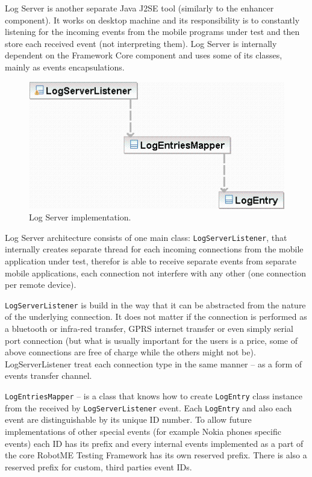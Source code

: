 Log Server is another separate Java J2SE tool (similarly to the enhancer component). It works on desktop
machine and its responsibility is to constantly listening for the incoming events from the
mobile programs under test and then store each received event (not interpreting them). Log Server is 
internally dependent on the Framework Core component and uses some of its classes, mainly
as events encapsulations.

\begin{figure}[t]%
\begin{center}
\includegraphics[width=.7\linewidth]{figures/uml-diagram-logserver}
\end{center}
\caption{Log Server implementation.}%
\label{fig:uml-diagram-logserver}
\end{figure}

Log Server architecture consists of one main class:
\texttt{LogServerListener}, that internally creates separate thread for each incoming
connections from the mobile application under test, therefor is able to receive
separate events from separate mobile applications, each connection not
interfere with any other (one connection per remote device).

\texttt{LogServerListener} is build in the way that it can be abstracted from the nature of
the underlying connection. It does not matter if the connection is performed as
a bluetooth or infra-red transfer, GPRS internet transfer or even simply
serial port connection (but what is usually important for the users is a price,
some of above connections are free of charge while the others might not be).
LogServerListener treat each connection type in the same manner -- as a form
of events transfer channel.

\texttt{LogEntriesMapper} -- is a class that knows how to create \texttt{LogEntry} class instance
from the received by \texttt{LogServerListener} event. Each \texttt{LogEntry} and also each event
are distinguishable by its unique ID number. To allow future implementations of
other special events (for example Nokia phones specific events) each ID
has its prefix and every internal events implemented as a part of the core RobotME Testing
Framework has its own reserved prefix. There is also a reserved prefix for custom,
third parties event IDs.

